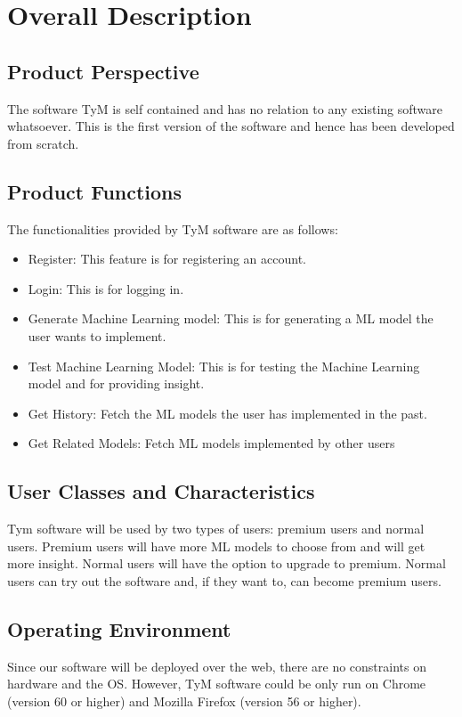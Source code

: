 \documentclass[12pt]{scrreprt}
\begin{document}
\chapter{Overall Description}

\section{Product Perspective}
The software TyM is self contained and has no relation to any existing software whatsoever. This is the first version of the software and hence has been developed from scratch.

\section{Product Functions}
The functionalities provided by TyM software are as follows: 
\begin{itemize}
\item Register: This feature is for registering an account.
\item Login: This is for logging in.
\item Generate Machine Learning model: This is for generating a ML model the user wants to implement.
\item Test Machine Learning Model: This is for testing the Machine Learning model and for providing insight.
\item Get History: Fetch the ML models the user has implemented in the past.
\item Get Related Models: Fetch ML models implemented by other users 
\end{itemize}

\section{User Classes and Characteristics}
Tym software will be used by two types of users: premium users and normal users. Premium users will have more ML models to choose from and will get more insight. Normal users will have the option to upgrade to premium. Normal users can try out the software and, if they want to, can become premium users.

\section{Operating Environment}
Since our software will be deployed over the web, there are no constraints on hardware and the OS. However, TyM software could be only run on Chrome (version 60 or higher) and Mozilla Firefox (version 56 or higher).
\end{document}
